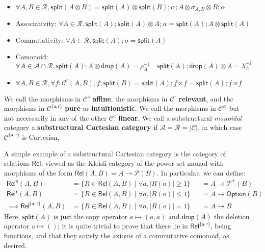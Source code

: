 \documentclass[acmsmall,screen,review]{acmart}
\newcommand{\mc}[1]{\ensuremath{\mathcal{#1}}}
\newcommand{\ms}[1]{\ensuremath{\mathsf{#1}}}
\begin{document}
\begin{definition}
\begin{itemize}
\begin{itemize}
      \item \(\forall A, B \in \mc{R}, \ms{split}(A \otimes B) = \ms{split}(A) \otimes \ms{split}(B);\alpha;A \otimes \sigma_{A, B} \otimes B;\alpha\)
      \item Associativity: \(\forall A \in \mc{R}, \ms{split}(A);\ms{split}(A) \otimes A;\alpha = \ms{split}(A);A \otimes \ms{split}(A)\)
      \item Commutativity: \(\forall A \in \mc{R}, \ms{split}(A);\sigma = \ms{split}(A)\)
      \item Comonoid: \(\forall A \in \mc{A} \cap \mc{R}, \ms{split}(A);A \otimes \ms{drop}(A) = \rho_A^{-1} \quad \ms{split}(A);\ms{drop}(A) \otimes A = \lambda_A^{-1}\)
      \item \(\forall A, B \in \mc{R}, \forall f: \mc{C}^{\ms{r}}(A, B), f;\ms{split}(B) = \ms{split}(A);f \ltimes f = \ms{split}(A);f\rtimes f\)
    \end{itemize}
  \end{itemize}
  We call the morphisms in \(\mc{C}^{\ms{a}}\) \textbf{affine}, the
  morphisms in \(\mc{C}^{\ms{r}}\) \textbf{relevant}, and the morphisms in
  \(\mc{C}^{\{\ms{a}, \ms{r}\}}\) \textbf{pure} or \textbf{intuitionistic}. We
  call the morphisms in \(\mc{C}^\varnothing\) but not necessarily in any of the
  other \(\mc{C}^q\) \textbf{linear}. We call a substructural \textit{monoidal}
  category a \textbf{substructural Cartesian category} if \(\mc{A} = \mc{R} =
  |\mc{C}|\), in which case \(\mc{C}^{\{\ms{a}, \ms{r}\}}\) is Cartesian.
\end{definition}
A simple example of a substructural Cartesian category is the category of
relations \(\ms{Rel}\), viewed as the Kleisli category of the power-set monad
with morphisms of the form \(\ms{Rel}(A, B) = A \to \mc{P}(B)\). In particular,
we can define:
\begin{equation}
  \begin{aligned}
    \ms{Rel}^{\ms{a}}(A, B) 
    &= \{R \in \ms{Rel}(A, B) \mid \forall a, |R(a)| \geq 1\} 
    &&= A \to \mc{P}^+(B) \\
    \ms{Rel}^{\ms{r}}(A, B) 
    &= \{R \in \ms{Rel}(A, B) \mid \forall a, |R(a)| \leq 1\} 
    &&= A \to \ms{Option}(B) \\
    \implies \ms{Rel}^{\{\ms{a}, \ms{r}\}}(A, B) 
    &= \{R \in \ms{Rel}(A, B) \mid \forall a, |R(a)| = 1\} 
    &&= A \to B
  \end{aligned}
\end{equation}
Here, \(\ms{split}(A)\) is just the copy operator \(a \mapsto (a, a)\) and
\(\ms{drop}(A)\) the deletion operator \(a \mapsto ()\); it is quite trivial to
prove that these lie in \(\ms{Rel}^{\{\ms{a}, \ms{r}\}}\), being functions, and
that they satisfy the axioms of a commutative comonoid, as desired. 
\end{document}
